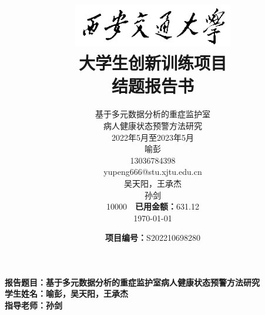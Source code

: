 \documentclass[12pt, a4paper, oneside]{ctexart}
\numberwithin{equation}{section}  %
\begin{document}
\title{
    \vspace{2cm}
    \includegraphics[width=7cm]{XJTU_logo}\\[1ex]
    \textbf{大学生创新训练项目\\[1ex]
    结题报告书} \vspace{3cm}
}
\preauthor{\begin{flushleft}\large}
\postauthor{\end{flushleft}}
\author{
    \hspace{3cm}\begin{minipage}[t]{0.65\linewidth}
基于多元数据分析的重症监护室\\
\makebox[5em][s]{}病人健康状态预警方法研究\\[1ex]
2022年5月至2023年5月\\[1ex]
喻彭\\[1ex]
13036784398\\[1ex]
yupeng666@stu.xjtu.edu.cn\\[1ex]
吴天阳，王承杰\\[1ex]
孙剑\\[1ex]
10000\ \ \textbf{已用金额：}631.12\\[1ex]
\today
    \end{minipage}
}
\date{\vspace{-22cm}\hspace{-12cm}\textbf{项目编号：}S202210698280}
\maketitle %
\thispagestyle{titlestyle}
\clearpage %
\thispagestyle{abstructstyle}
\noindent\textbf{报告题目：基于多元数据分析的重症监护室病人健康状态预警方法研究}\\
\textbf{学生姓名：喻彭，吴天阳，王承杰}\\
\textbf{指导老师：孙剑}\\[1em]
\end{document}
